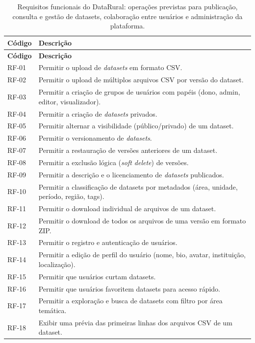\begin{longtable}{p{}p{}}
\caption{Requisitos funcionais do DataRural: operações previstas para publicação, consulta e gestão de datasets, colaboração entre usuários e administração da plataforma.}\label{tab:requisitos_funcionais}\\
\toprule
\textbf{Código} & \textbf{Descrição} \\
\midrule
\endfirsthead
\toprule
\textbf{Código} & \textbf{Descrição} \\
\midrule
\endhead
RF-01 & Permitir o upload de \textit{datasets} em formato CSV. \\
RF-02 & Permitir o upload de múltiplos arquivos CSV por versão do dataset. \\
RF-03 & Permitir a criação de grupos de usuários com papéis (dono, admin, editor, visualizador). \\
RF-04 & Permitir a criação de \textit{datasets} privados. \\
RF-05 & Permitir alternar a visibilidade (público/privado) de um dataset. \\
RF-06 & Permitir o versionamento de \textit{datasets}. \\
RF-07 & Permitir a restauração de versões anteriores de um dataset. \\
RF-08 & Permitir a exclusão lógica (\textit{soft delete}) de versões. \\
RF-09 & Permitir a descrição e o licenciamento de \textit{datasets} publicados. \\
RF-10 & Permitir a classificação de datasets por metadados (área, unidade, período, região, tags). \\
RF-11 & Permitir o download individual de arquivos de um dataset. \\
RF-12 & Permitir o download de todos os arquivos de uma versão em formato ZIP. \\
RF-13 & Permitir o registro e autenticação de usuários. \\
RF-14 & Permitir a edição de perfil do usuário (nome, bio, avatar, instituição, localização). \\
RF-15 & Permitir que usuários curtam datasets. \\
RF-16 & Permitir que usuários favoritem datasets para acesso rápido. \\
RF-17 & Permitir a exploração e busca de datasets com filtro por área temática. \\
RF-18 & Exibir uma prévia das primeiras linhas dos arquivos CSV de um dataset. \\

\end{longtable}
